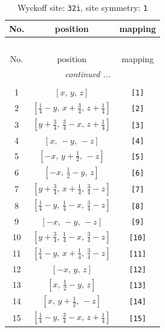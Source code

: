 \documentclass[fleqn,8pt]{jsarticle}
\begin{document}
\renewcommand{\arraystretch}{1.2}
\begin{longtable}{ccc}
\caption{Wyckoff site: {\tt 32i}, site symmetry: {\tt 1}}
 \\
 \hline \hline
No. & position & mapping \\ \hline \endfirsthead

\multicolumn{2}{l}{\tablename\ \thetable{}} \\
 \hline \hline
No. & position & mapping \\ \hline \endhead

 \hline \hline
\multicolumn{2}{r}{\footnotesize\it continued ...} \\ \endfoot

 \hline \hline
\multicolumn{2}{r}{} \\ \endlastfoot

1 & $\left[ x,\, y,\, z \right]$ & {\tt [1]} \\ \hline
2 & $\left[ \frac{1}{4} - y,\, x + \frac{3}{4},\, z + \frac{1}{4} \right]$ & {\tt [2]} \\ \hline
3 & $\left[ y + \frac{3}{4},\, \frac{3}{4} - x,\, z + \frac{1}{4} \right]$ & {\tt [3]} \\ \hline
4 & $\left[ x,\, - y,\, - z \right]$ & {\tt [4]} \\ \hline
5 & $\left[ - x,\, y + \frac{1}{2},\, - z \right]$ & {\tt [5]} \\ \hline
6 & $\left[ - x,\, \frac{1}{2} - y,\, z \right]$ & {\tt [6]} \\ \hline
7 & $\left[ y + \frac{3}{4},\, x + \frac{1}{4},\, \frac{3}{4} - z \right]$ & {\tt [7]} \\ \hline
8 & $\left[ \frac{1}{4} - y,\, \frac{1}{4} - x,\, \frac{3}{4} - z \right]$ & {\tt [8]} \\ \hline
9 & $\left[ - x,\, - y,\, - z \right]$ & {\tt [9]} \\ \hline
10 & $\left[ y + \frac{3}{4},\, \frac{1}{4} - x,\, \frac{3}{4} - z \right]$ & {\tt [10]} \\ \hline
11 & $\left[ \frac{1}{4} - y,\, x + \frac{1}{4},\, \frac{3}{4} - z \right]$ & {\tt [11]} \\ \hline
12 & $\left[ - x,\, y,\, z \right]$ & {\tt [12]} \\ \hline
13 & $\left[ x,\, \frac{1}{2} - y,\, z \right]$ & {\tt [13]} \\ \hline
14 & $\left[ x,\, y + \frac{1}{2},\, - z \right]$ & {\tt [14]} \\ \hline
15 & $\left[ \frac{1}{4} - y,\, \frac{3}{4} - x,\, z + \frac{1}{4} \right]$ & {\tt [15]} \\ \hline

\end{longtable}
\end{document}
